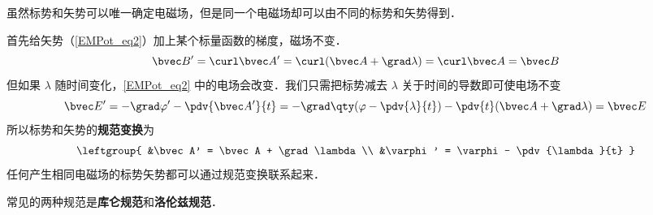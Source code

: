 

虽然标势和矢势可以唯一确定电磁场，但是同一个电磁场却可以由不同的标势和矢势得到．

首先给矢势（\autoref{EMPot_eq2}）加上某个标量函数的梯度，磁场不变．
\begin{equation}
\bvec B' = \curl \bvec A' = \curl (\bvec A + \grad \lambda) = \curl \bvec A = \bvec B
\end{equation}
但如果 $\lambda$ 随时间变化，\autoref{EMPot_eq2} 中的电场会改变．我们只需把标势减去 $\lambda$ 关于时间的导数即可使电场不变
\begin{equation}
\bvec E' = -\grad \varphi' - \pdv{\bvec A'}{t} = -\grad \qty(\varphi - \pdv{\lambda}{t}) - \pdv{t} (\bvec A + \grad \lambda) = \bvec E
\end{equation}
所以标势和矢势的\textbf{规范变换}为
\begin{equation}\label{Gauge_eq3}
\leftgroup{
&\bvec A' = \bvec A + \grad \lambda\\
&\varphi' = \varphi - \pdv{\lambda}{t}
}\end{equation}
任何产生相同电磁场的标势矢势都可以通过规范变换联系起来．

常见的两种规范是\textbf{库仑规范}和\textbf{洛伦兹规范}．
